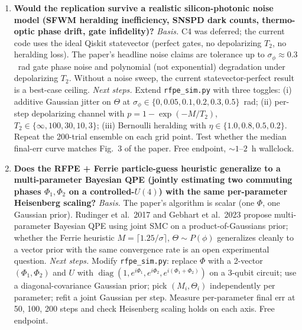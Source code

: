 \begin{enumerate}
\item \textbf{Would the replication survive a realistic silicon-photonic
    noise model (SFWM heralding inefficiency, SNSPD dark counts,
    thermo-optic phase drift, gate infidelity)?}
  \emph{Basis.}  C4 was deferred; the current code uses the ideal
  Qiskit statevector (perfect gates, no depolarizing $T_2$, no heralding
  loss).  The paper's headline noise claims are tolerance up to
  $\sigma_\phi\!\approx\! 0.3$~rad gate phase noise and polynomial
  (not exponential) degradation under depolarizing $T_2$.  Without a
  noise sweep, the current statevector-perfect result is a best-case
  ceiling.
  \emph{Next steps.}  Extend \texttt{rfpe\_sim.py} with three toggles:
  (i) additive Gaussian jitter on $\Theta$ at
  $\sigma_\phi\in\{0,0.05,0.1,0.2,0.3,0.5\}$~rad; (ii) per-step
  depolarizing channel with $p=1-\exp(-M/T_2)$,
  $T_2\in\{\infty,100,30,10,3\}$; (iii) Bernoulli heralding with
  $\eta\in\{1.0,0.8,0.5,0.2\}$.  Repeat the 200-trial ensemble on each
  grid point.  Test whether the median final-err curve matches
  Fig.~3 of the paper.  Free endpoint, $\sim 1$--$2$~h wallclock.

\item \textbf{Does the RFPE + Ferrie particle-guess heuristic generalize
    to a multi-parameter Bayesian QPE (jointly estimating two commuting
    phases $\Phi_1,\Phi_2$ on a controlled-$U(4)$) with the same
    per-parameter Heisenberg scaling?}
  \emph{Basis.}  The paper's algorithm is scalar (one $\Phi$, one Gaussian
  prior).  Rudinger et al.~2017 and Gebhart et al.~2023 propose
  multi-parameter Bayesian QPE using joint SMC on a product-of-Gaussians
  prior; whether the Ferrie heuristic $M=\lceil 1.25/\sigma\rceil$,
  $\Theta\sim P(\phi)$ generalizes cleanly to a vector prior with the
  same convergence rate is an open experimental question.
  \emph{Next steps.}  Modify \texttt{rfpe\_sim.py}: replace $\Phi$ with a
  2-vector $(\Phi_1,\Phi_2)$ and $U$ with
  $\operatorname{diag}(1,e^{i\Phi_1},e^{i\Phi_2},e^{i(\Phi_1+\Phi_2)})$ on a
  3-qubit circuit; use a diagonal-covariance Gaussian prior; pick $(M_i,
  \Theta_i)$ independently per parameter; refit a joint Gaussian per
  step.  Measure per-parameter final err at 50, 100, 200 steps and check
  Heisenberg scaling holds on each axis.  Free endpoint.


\end{enumerate}
